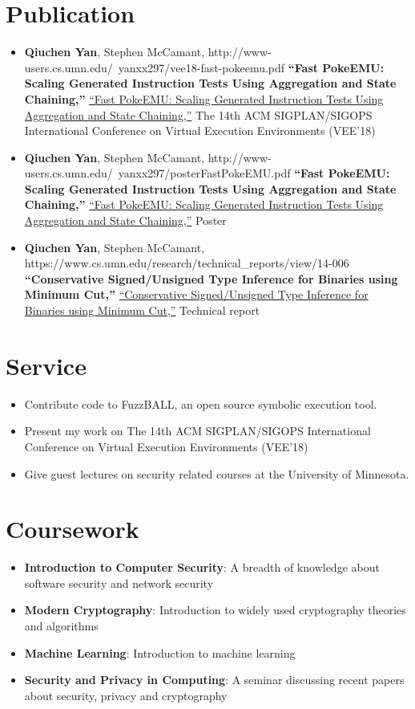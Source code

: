 \documentclass[letterpaper,11pt]{article}
\newcommand{\brief}[2]{
  \item[]\small{
    \textbf{#1}{: #2 \vspace{-2pt}}
  }
}
\newcommand{\myitem}[1]{
  \item[-]\small{
    { #1 \vspace{-2pt}}
  }
}
\newcommand{\bib}[4]{
  \vspace{-1pt}\item[]
      {\small#2},
      \ifx\hfuzz#4\hfuzz
      \textbf{\small``#1,''}      
      \else
      \href{#4}{\small``#1,''}
      \fi      
      \small{#3}
    \vspace{-2pt}
}
\newcommand{\content}{\begin{itemize}[leftmargin=0px]}
\newcommand{\contentend}{\end{itemize}}
\newcommand{\mylist}{\begin{itemize}[leftmargin=25px,rightmargin=25px]}
\newcommand{\mylistend}{\end{itemize}\vspace{-5pt}}
\begin{document}
\section{Publication}
	\content
    \bib
      {Fast PokeEMU: Scaling Generated Instruction Tests Using 
      Aggregation and State Chaining}
      {\textbf{Qiuchen Yan}, Stephen McCamant}
      {The 14th ACM SIGPLAN/SIGOPS International Conference on Virtual Execution Environments (VEE'18)}
      {http://www-users.cs.umn.edu/~yanxx297/vee18-fast-pokeemu.pdf}
    \bib
      {Fast PokeEMU: Scaling Generated Instruction Tests Using 
      Aggregation and State Chaining}
      {\textbf{Qiuchen Yan}, Stephen McCamant}
      {Poster}
      {http://www-users.cs.umn.edu/~yanxx297/posterFastPokeEMU.pdf}     
    \bib
      {Conservative Signed/Unsigned Type Inference for Binaries
      using Minimum Cut}
      {\textbf{Qiuchen Yan}, Stephen McCamant}
      {Technical report}
      {https://www.cs.umn.edu/research/technical_reports/view/14-006}             
  \contentend         
\section{Service}
\mylist
\myitem{Contribute code to FuzzBALL, an open source symbolic execution tool.}
\myitem{Present my work on The 14th ACM SIGPLAN/SIGOPS International Conference on Virtual Execution Environments (VEE'18)}
\myitem{Give guest lectures on security related courses at the University of Minnesota.}
\mylistend

%
\section{Coursework}
  \content
    \brief
      {Introduction to Computer Security}
      {A breadth of knowledge about software security and network security}   
    \brief
      {Modern Cryptography}
      {Introduction to widely used cryptography theories and algorithms}
    \brief
      {Machine Learning}
      {Introduction to machine learning}      
    \brief
      {Security and Privacy in Computing}
      {A seminar discussing recent papers about security, privacy and cryptography}
  \contentend  



\end{document}
